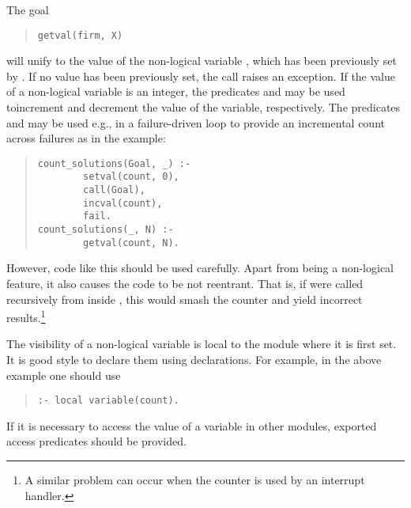 The goal
\begin{quote}
\begin{verbatim}
getval(firm, X)
\end{verbatim}
\end{quote}
will unify  to
the value of the non-logical variable , which has been previously
set by
.
If no value has been previously set, the call raises an exception.
If the value of a non-logical variable is an integer, the predicates
and 
may be used toincrement and decrement the value of the
variable, respectively.
The predicates  and
 may be used e.g., in a
failure-driven loop to provide
an incremental count across failures as in the example:
\begin{quote}
\begin{verbatim}
count_solutions(Goal, _) :-
        setval(count, 0),
        call(Goal),
        incval(count),
        fail.
count_solutions(_, N) :-
        getval(count, N).
\end{verbatim}
\end{quote}
However, code like this should be used carefully.
Apart from being a non-logical feature, it also causes the code to be
not reentrant. That is, if  were called recursively
from
inside , this would smash the counter and yield incorrect
results.\footnote{%
  A similar problem can occur when the counter is used by an interrupt handler.}

The visibility of a non-logical variable is local to the module
where it is first set. It is good style to declare them using
declarations. For example, in the above example one should use
\begin{quote}
\begin{verbatim}
:- local variable(count).
\end{verbatim}
\end{quote}
If it is necessary to access the value of a variable in other modules,
exported access predicates should be provided.


